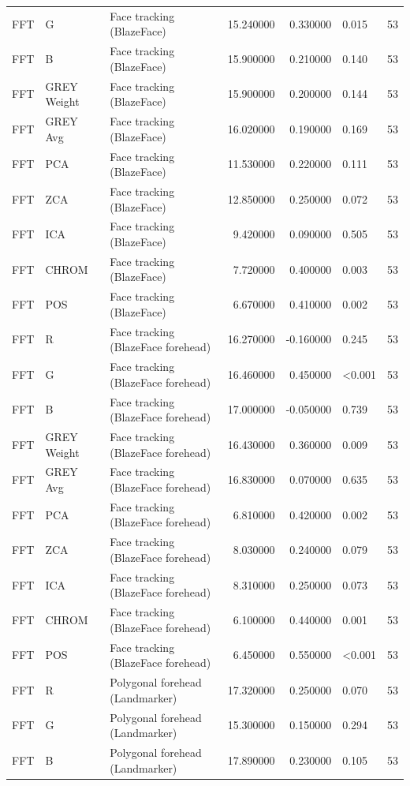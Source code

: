 \begin{table}[htbp]
\begin{tabular}{l l l r r l r}
FFT & G & Face tracking (BlazeFace) & 15.240000 & 0.330000 & 0.015 & 53 \\
FFT & B & Face tracking (BlazeFace) & 15.900000 & 0.210000 & 0.140 & 53 \\
FFT & GREY Weight & Face tracking (BlazeFace) & 15.900000 & 0.200000 & 0.144 & 53 \\
FFT & GREY Avg & Face tracking (BlazeFace) & 16.020000 & 0.190000 & 0.169 & 53 \\
FFT & PCA & Face tracking (BlazeFace) & 11.530000 & 0.220000 & 0.111 & 53 \\
FFT & ZCA & Face tracking (BlazeFace) & 12.850000 & 0.250000 & 0.072 & 53 \\
FFT & ICA & Face tracking (BlazeFace) & 9.420000 & 0.090000 & 0.505 & 53 \\
FFT & CHROM & Face tracking (BlazeFace) & 7.720000 & 0.400000 & 0.003 & 53 \\
FFT & POS & Face tracking (BlazeFace) & 6.670000 & 0.410000 & 0.002 & 53 \\
FFT & R & Face tracking (BlazeFace forehead) & 16.270000 & -0.160000 & 0.245 & 53 \\
FFT & G & Face tracking (BlazeFace forehead) & 16.460000 & 0.450000 & <0.001 & 53 \\
FFT & B & Face tracking (BlazeFace forehead) & 17.000000 & -0.050000 & 0.739 & 53 \\
FFT & GREY Weight & Face tracking (BlazeFace forehead) & 16.430000 & 0.360000 & 0.009 & 53 \\
FFT & GREY Avg & Face tracking (BlazeFace forehead) & 16.830000 & 0.070000 & 0.635 & 53 \\
FFT & PCA & Face tracking (BlazeFace forehead) & 6.810000 & 0.420000 & 0.002 & 53 \\
FFT & ZCA & Face tracking (BlazeFace forehead) & 8.030000 & 0.240000 & 0.079 & 53 \\
FFT & ICA & Face tracking (BlazeFace forehead) & 8.310000 & 0.250000 & 0.073 & 53 \\
FFT & CHROM & Face tracking (BlazeFace forehead) & 6.100000 & 0.440000 & 0.001 & 53 \\
FFT & POS & Face tracking (BlazeFace forehead) & 6.450000 & 0.550000 & <0.001 & 53 \\
FFT & R & Polygonal forehead (Landmarker) & 17.320000 & 0.250000 & 0.070 & 53 \\
FFT & G & Polygonal forehead (Landmarker) & 15.300000 & 0.150000 & 0.294 & 53 \\
FFT & B & Polygonal forehead (Landmarker) & 17.890000 & 0.230000 & 0.105 & 53 \\

\end{tabular}
\end{table}
